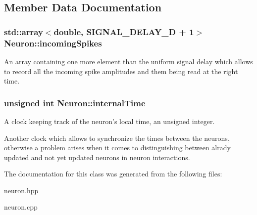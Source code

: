 \subsection{Member Data Documentation}
\hypertarget{classNeuron_a15160c28823ad0e63f171af31fd6b1ea}{
\subsubsection[{incoming\-Spikes}]{\setlength{\rightskip}{0pt plus 5cm}std\-::array$<$double, S\-I\-G\-N\-A\-L\-\_\-\-D\-E\-L\-A\-Y\-\_\-\-D + 1$>$ Neuron\-::incoming\-Spikes\hspace{0.3cm}{\ttfamily [private]}}}\label{classNeuron_a15160c28823ad0e63f171af31fd6b1ea}
An array containing one more element than the uniform signal delay which allows to record all the incoming spike amplitudes and them being read at the right time. \hypertarget{classNeuron_adb1a016b5d339ba3ba95367bb66f391a}{
\subsubsection[{internal\-Time}]{\setlength{\rightskip}{0pt plus 5cm}unsigned int Neuron\-::internal\-Time\hspace{0.3cm}{\ttfamily [private]}}}\label{classNeuron_adb1a016b5d339ba3ba95367bb66f391a}


A clock keeping track of the neuron's local time, an unsigned integer. 

Another clock which allows to synchronize the times between the neurons, otherwise a problem arises when it comes to distinguishing between alrady updated and not yet updated neurons in neuron interactions. 

The documentation for this class was generated from the following files\-:\begin{DoxyCompactItemize}
\item 
neuron.\-hpp\item 
neuron.\-cpp\end{DoxyCompactItemize}
